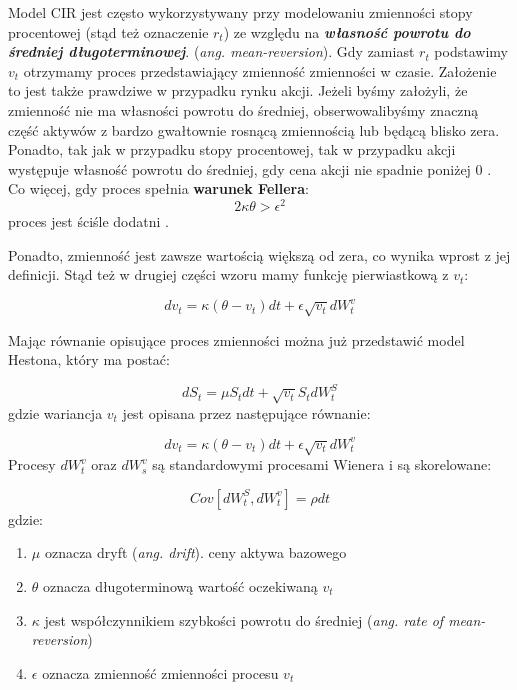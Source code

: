 \documentclass{pracamgr}
\begin{document}
Model CIR jest często wykorzystywany przy modelowaniu zmienności stopy procentowej (stąd też 
oznaczenie $r_t$) ze względu na \textbf{\textit{własność powrotu do średniej długoterminowej}}. 
(\textit{ang. mean-reversion}). Gdy zamiast $r_t$ podstawimy $v_t$ otrzymamy proces przedstawiający 
zmienność zmienności w czasie. Założenie to jest także prawdziwe w przypadku rynku 
akcji. Jeżeli byśmy założyli, że zmienność nie ma własności powrotu do średniej, obserwowalibyśmy 
znaczną część aktywów z bardzo gwałtownie rosnącą zmiennością lub będącą blisko zera.
Ponadto, tak jak w przypadku stopy procentowej, tak w przypadku akcji występuje własność powrotu do 
średniej, gdy cena akcji nie spadnie poniżej 0  \cite{TestingMeanReversion}.
Co więcej, gdy proces spełnia \textbf{warunek Fellera}:
\begin{equation}
2 \kappa \theta > \epsilon^2
\end{equation}
proces jest ściśle dodatni  \cite{TheLittleHestonTrap}.


Ponadto, zmienność jest zawsze wartością większą od zera, co wynika wprost z jej definicji. Stąd też 
w drugiej części wzoru mamy funkcję pierwiastkową z $v_t$: 

\begin{equation} 
dv_t  = \kappa (\theta - v_t)dt + \epsilon \sqrt{v_t} dW_t^v 
\end{equation}

Mając równanie opisujące proces zmienności można już przedstawić model Hestona, który ma postać:

\begin{equation}
dS_t  = \mu S_t dt + \sqrt{v_t} S_t dW^S_t
\end{equation}
gdzie wariancja $v_t$ jest opisana przez następujące równanie: 

\begin{equation}
dv_t  = \kappa (\theta - v_t)dt + \epsilon \sqrt{v_t} dW_t^v 
\end{equation}
Procesy $dW_t^v$ oraz $dW_s^v$ są standardowymi procesami Wienera i są 
skorelowane:

\begin{equation}
Cov[dW^S_t, dW^v_t] = \rho dt 
\end{equation}
gdzie:

\begin{enumerate}
\item $\mu$ oznacza dryft (\textit{ang. drift}). ceny aktywa bazowego 
\item $\theta$ oznacza długoterminową wartość oczekiwaną $v_t$
\item $\kappa$ jest współczynnikiem szybkości powrotu do średniej (\textit{ang. rate of mean-reversion})
\item $\epsilon$ oznacza zmienność zmienności procesu $v_t$
\end{enumerate}
\end{document}
